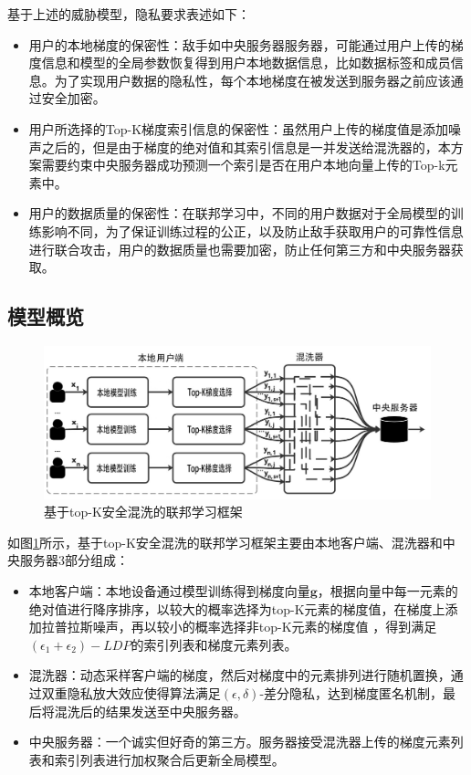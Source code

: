 基于上述的威胁模型，隐私要求表述如下：
\begin{itemize}
  \item 用户的本地梯度的保密性：敌手如中央服务器服务器，可能通过用户上传的梯度信息和模型的全局参数恢复得到用户本地数据信息，比如数据标签和成员信息。为了实现用户数据的隐私性，每个本地梯度在被发送到服务器之前应该通过安全加密。
  \item 用户所选择的Top-K梯度索引信息的保密性：虽然用户上传的梯度值是添加噪声之后的，但是由于梯度的绝对值和其索引信息是一并发送给混洗器的，本方案需要约束中央服务器成功预测一个索引是否在用户本地向量上传的Top-k元素中。
  \item 用户的数据质量的保密性：在联邦学习中，不同的用户数据对于全局模型的训练影响不同，为了保证训练过程的公正，以及防止敌手获取用户的可靠性信息进行联合攻击，用户的数据质量也需要加密，防止任何第三方和中央服务器获取。
\end{itemize}

\subsection{模型概览}
\begin{figure}[!hbt]
\centering
	\includegraphics[scale=0.5]{fig2/C4/模型概况图}%
	\caption{基于top-K安全混洗的联邦学习框架}
	\label{fig:基于安全混洗和Top-K梯度选择算法的联邦学习模型框架}	
\end{figure}

如图\ref{fig:基于安全混洗和Top-K梯度选择算法的联邦学习模型框架}所示，基于top-K安全混洗的联邦学习框架主要由本地客户端、混洗器和中央服务器3部分组成：
\begin{itemize}
  \item 本地客户端：本地设备通过模型训练得到梯度向量$\mathbf{g}$，根据向量中每一元素的绝对值进行降序排序，以较大的概率选择为top-K元素的梯度值，在梯度上添加拉普拉斯噪声，再以较小的概率选择非top-K元素的梯度值
，得到满足$\left(\epsilon_{1}+\epsilon_{2}\right)-LDP$的索引列表和梯度元素列表。
  \item 混洗器：动态采样客户端的梯度，然后对梯度中的元素排列进行随机置换，通过双重隐私放大效应使得算法满足$(\epsilon, \delta)$-差分隐私，达到梯度匿名机制，最后将混洗后的结果发送至中央服务器。
  \item 中央服务器：一个诚实但好奇的第三方。服务器接受混洗器上传的梯度元素列表和索引列表进行加权聚合后更新全局模型。
\end{itemize}

